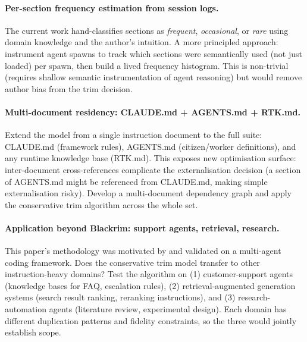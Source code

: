 \paragraph{Per-section frequency estimation from session logs.}

The current work hand-classifies sections as \emph{frequent}, \emph{occasional},
or \emph{rare} using domain knowledge and the author's intuition. A more
principled approach: instrument agent spawns to track which sections were
semantically used (not just loaded) per spawn, then build a lived frequency
histogram. This is non-trivial (requires shallow semantic instrumentation
of agent reasoning) but would remove author bias from the trim decision.

\paragraph{Multi-document residency: CLAUDE.md + AGENTS.md + RTK.md.}

Extend the model from a single instruction document to the full suite:
CLAUDE.md (framework rules), AGENTS.md (citizen/worker definitions), and
any runtime knowledge base (RTK.md). This exposes new optimisation surface:
inter-document cross-references complicate the externalisation decision
(a section of AGENTS.md might be referenced from CLAUDE.md, making simple
externalisation risky). Develop a multi-document dependency graph and
apply the conservative trim algorithm across the whole set.

\paragraph{Application beyond Blackrim: support agents, retrieval, research.}

This paper's methodology was motivated by and validated on a multi-agent
coding framework. Does the conservative trim model transfer to other instruction-heavy
domains? Test the algorithm on (1) customer-support agents (knowledge bases
for FAQ, escalation rules), (2) retrieval-augmented generation systems (search
result ranking, reranking instructions), and (3) research-automation agents
(literature review, experimental design). Each domain has different duplication
patterns and fidelity constraints, so the three would jointly establish scope.
